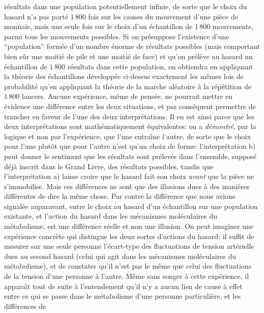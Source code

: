r\'esultats dans une population potentiellement infinie,  de sorte que 
le choix du hasard n'a pas port\'e $1\, 800$ fois sur les causes du 
mouvement d'une pi\`ece de monnaie, mais une seule fois sur le choix 
d'un \'echantillon de $1\, 800$ mouvements, parmi tous les mouvements 
possibles. 
\medskip 
Si on pr\'esuppose l'existence d'une ``population'' form\'ee d'un nombre
\'enorme de r\'esultats possibles (mais comportant bien s\^ur une
moiti\'e de pile et une moiti\'e de face) et qu'on pr\'el\`eve au hasard un 
\'echantillon de $1\, 800$ r\'esultats dans cette population, on
obtiendra en appliquant la th\'eorie des \'echantillons d\'evelopp\'ee 
ci-dessus exactement les m\^emes lois de probabilit\'e qu'en appliquant 
la th\'eorie de la marche al\'eatoire \`a la r\'ep\'etition de $1\, 800$ 
lancers. Aucune exp\'erience, m\^eme de pens\'ee, ne pourrait mettre en 
\'evidence une diff\'erence entre les deux situations,  et par 
cons\'equent permettre de trancher en faveur de l'une des deux 
interpr\'etations.  Il en est ainsi parce que les deux interpr\'etations 
sont math\'ematiquement \'equivalentes:  on a {\it d\'emontr\'e},  par la 
logique et non par l'exp\'erience,  que l'une entra{\^\i}ne l'autre,  de
sorte que le choix pour l'une plut\^ot que pour l'autre n'est qu'un choix de 
forme:  l'interpr\'etation b) peut donner le sentiment que les r\'esultats 
sont pr\'elev\'es dans l'ensemble,  suppos\'e d\'ej\`a inscrit dans le 
Grand Livre,  des r\'esultats possibles,  tandis que l'interpr\'etation a)
laisse croire que le hasard fait son choix {\it avant} que la pi\`ece ne 
s'immobilise.  Mais ces diff\'erences ne sont que des illusions dues \`a 
des mani\`eres diff\'erentes de dire la m\^eme chose. 
\medskip 
Par contre la diff\'erence que nous avions signal\'ee auparavant,  entre  
le choix au hasard d'un \'echantillon sur une population existante, 
et l'action du hasard dans les m\'ecanismes mol\'eculaires du 
m\'etabolisme,  est une diff\'erence r\'eelle et non une illusion. 
On peut imaginer une exp\'erience concr\`ete qui distingue les deux
sortes d'actions du hasard:  il suffit de mesurer sur une seule personne 
l'\'ecart-type des fluctuations de tension art\'erielle dues au second 
hasard (celui qui agit dans les m\'ecanismes mol\'eculaires du 
m\'etabolisme), et de constater qu'il n'est pas le m\^eme que celui des 
fluctuations de la tension d'une personne \`a l'autre. M\^eme sans songer 
\`a cette exp\'erience, il appara{\^\i}t tout de suite \`a l'entendement 
qu'il n'y a aucun lien de cause \`a effet entre ce qui se passe dans le 
m\'etabolisme d'une personne particuli\`ere, et les diff\'erences de 
